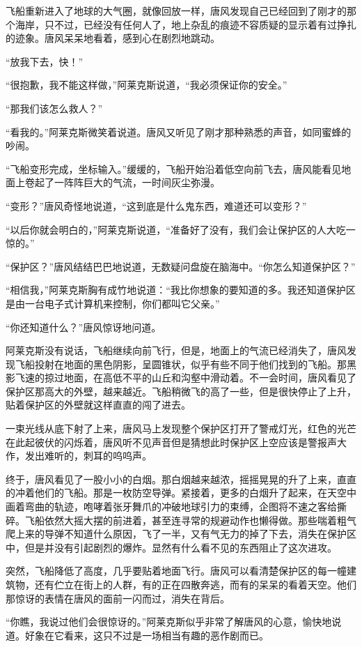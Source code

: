 飞船重新进入了地球的大气圈，就像回放一样，唐风发现自己已经回到了刚才的那个海岸，只不过，已经没有任何人了，地上杂乱的痕迹不容质疑的显示着有过挣扎的迹象。唐风呆呆地看着，感到心在剧烈地跳动。

“放我下去，快！”

“很抱歉，我不能这样做，”阿莱克斯说道，“我必须保证你的安全。”

“那我们该怎么救人？”

“看我的。”阿莱克斯微笑着说道。唐风又听见了刚才那种熟悉的声音，如同蜜蜂的吵闹。

“飞船变形完成，坐标输入。”缓缓的，飞船开始沿着低空向前飞去，唐风能看见地面上卷起了一阵阵巨大的气流，一时间灰尘弥漫。

“变形？”唐风奇怪地说道，“这到底是什么鬼东西，难道还可以变形？”

“以后你就会明白的，”阿莱克斯说道，“准备好了没有，我们会让保护区的人大吃一惊的。”

“保护区？”唐风结结巴巴地说道，无数疑问盘旋在脑海中。“你怎么知道保护区？”

“相信我，”阿莱克斯胸有成竹地说道：“我比你想象的要知道的多。我还知道保护区是由一台电子式计算机来控制，你们都叫它父亲。”

“你还知道什么？”唐风惊讶地问道。

阿莱克斯没有说话，飞船继续向前飞行，但是，地面上的气流已经消失了，唐风发现飞船投射在地面的黑色阴影，呈圆锥状，似乎有些不同于他们找到的飞船。那黑影飞速的掠过地面，在高低不平的山丘和沟壑中滑动着。不一会时间，唐风看见了保护区那高大的外壁，越来越近。飞船稍微飞的高了一些，但是很快停止了上升，贴着保护区的外壁就这样直直的闯了进去。

一束光线从底下射了上来，唐风马上发现整个保护区打开了警戒灯光，红色的光芒在此起彼伏的闪烁着，唐风听不见声音但是猜想此时保护区上空应该是警报声大作，发出难听的，刺耳的呜呜声。

终于，唐风看见了一股小小的白烟。那白烟越来越浓，摇摇晃晃的升了上来，直直的冲着他们的飞船。那是一枚防空导弹。紧接着，更多的白烟升了起来，在天空中画着弯曲的轨迹，咆哮着张牙舞爪的冲破地球引力的束缚，企图将不速之客给撕碎。飞船依然大摇大摆的前进着，甚至连寻常的规避动作也懒得做。那些喘着粗气爬上来的导弹不知道什么原因，飞了一半，又有气无力的掉了下去，消失在保护区中，但是并没有引起剧烈的爆炸。显然有什么看不见的东西阻止了这次进攻。

突然，飞船降低了高度，几乎要贴着地面飞行。唐风可以看清楚保护区的每一幢建筑物，还有伫立在街上的人群，有的正在四散奔逃，而有的呆呆的看着天空。他们那惊讶的表情在唐风的面前一闪而过，消失在背后。

“你瞧，我说过他们会很惊讶的。”阿莱克斯似乎非常了解唐风的心意，愉快地说道。好象在它看来，这只不过是一场相当有趣的恶作剧而已。

